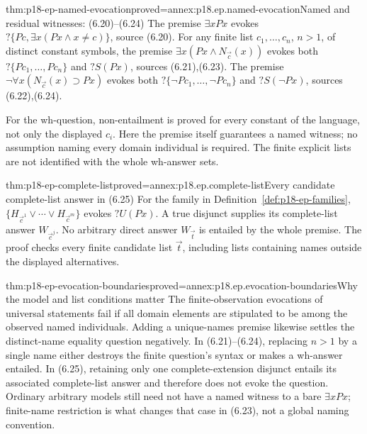 \begin{hbtheorem}{thm:p18-ep-named-evocation}{proved=annex:p18.ep.named-evocation}{Named and residual witnesses: (6.20)--(6.24)}
The premise \(\exists xPx\) evokes
\(?\{Pc,\exists x(Px\land x\ne c)\}\), source (6.20).
For any finite list \(c_1,\ldots,c_n\), \(n>1\), of distinct constant
symbols, the premise \(\exists x(Px\land N_{\vec c}(x))\) evokes both
\(?\{Pc_1,\ldots,Pc_n\}\) and \(?S(Px)\), sources (6.21),(6.23).
The premise \(\neg\forall x(N_{\vec c}(x)\supset Px)\) evokes both
\(?\{\neg Pc_1,\ldots,\neg Pc_n\}\) and \(?S(\neg Px)\),
sources (6.22),(6.24).

For the wh-question, non-entailment is proved for every constant of the
language, not only the displayed \(c_i\). Here the premise itself
guarantees a named witness; no assumption naming every domain individual
is required. The finite explicit lists are not identified with the whole
wh-answer sets.
\end{hbtheorem}

\begin{hbtheorem}{thm:p18-ep-complete-list}{proved=annex:p18.ep.complete-list}{Every candidate complete-list answer in (6.25)}
For the family in Definition~\ref{def:p18-ep-families},
\(\{H_{\vec c^{1}}\lor\cdots\lor H_{\vec c^{m}}\}\) evokes
\(?U(Px)\). A true disjunct supplies its complete-list answer
\(W_{\vec c^{j}}\). No arbitrary direct answer
\(W_{\vec t}\) is entailed by the whole premise.
The proof checks every finite candidate list \(\vec t\), including
lists containing names outside the displayed alternatives.
\end{hbtheorem}

\begin{hbtheorem}{thm:p18-ep-evocation-boundaries}{proved=annex:p18.ep.evocation-boundaries}{Why the model and list conditions matter}
The finite-observation evocations of universal statements fail if all
domain elements are stipulated to be among the observed named individuals.
Adding a unique-names premise likewise settles the distinct-name equality
question negatively. In (6.21)--(6.24), replacing \(n>1\) by a single
name either destroys the finite question's syntax or makes a wh-answer
entailed. In (6.25), retaining only one complete-extension disjunct entails
its associated complete-list answer and therefore does not evoke the
question. Ordinary arbitrary models still need not have a named witness
to a bare \(\exists xPx\); finite-name restriction is what changes that
case in (6.23), not a global naming convention.
\end{hbtheorem}

